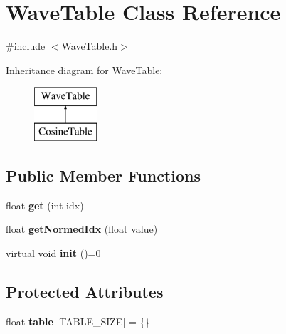 \hypertarget{classWaveTable}{\section{Wave\-Table Class Reference}
\label{classWaveTable}
}


{\ttfamily \#include $<$Wave\-Table.\-h$>$}

Inheritance diagram for Wave\-Table\-:\begin{figure}[H]
\begin{center}
\leavevmode
\includegraphics[height=2.000000cm]{classWaveTable}
\end{center}
\end{figure}
\subsection*{Public Member Functions}
\begin{DoxyCompactItemize}
\item 
\hypertarget{classWaveTable_afd23f7ecfb0b1bfb15164c49b7d9c95e}{float {\bfseries get} (int idx)}\label{classWaveTable_afd23f7ecfb0b1bfb15164c49b7d9c95e}

\item 
\hypertarget{classWaveTable_a3fa4d93994b56dee6f0083e063dd53b5}{float {\bfseries get\-Normed\-Idx} (float value)}\label{classWaveTable_a3fa4d93994b56dee6f0083e063dd53b5}

\item 
\hypertarget{classWaveTable_addb817963f443ed6edaba3be9b8edec5}{virtual void {\bfseries init} ()=0}\label{classWaveTable_addb817963f443ed6edaba3be9b8edec5}

\end{DoxyCompactItemize}
\subsection*{Protected Attributes}
\begin{DoxyCompactItemize}
\item 
\hypertarget{classWaveTable_aac70194676deffaf65f02a79f9d49aeb}{float {\bfseries table} \mbox{[}T\-A\-B\-L\-E\-\_\-\-S\-I\-Z\-E\mbox{]} = \{\}}\label{classWaveTable_aac70194676deffaf65f02a79f9d49aeb}

\end{DoxyCompactItemize}
